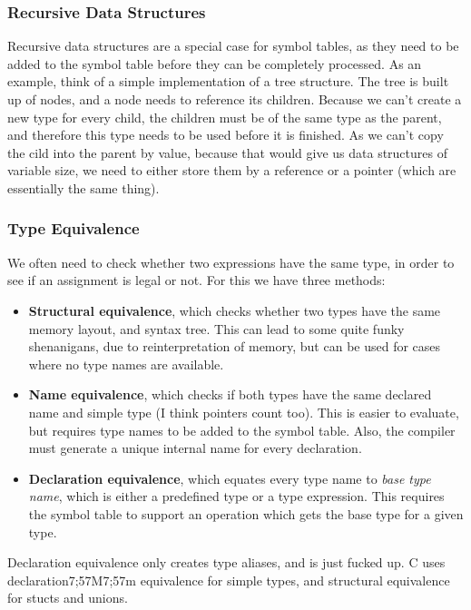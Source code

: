 \documentclass{article}
\begin{document}
\subsubsection{Recursive Data Structures}
Recursive data structures are a special case for symbol tables, as they need to be added to the symbol table before they can be completely processed.
As an example, think of a simple implementation of a tree structure.
The tree is built up of nodes, and a node needs to reference its children.
Because we can't create a new type for every child, the children must be of the same type as the parent, and therefore this type needs to be used before it is finished.
As we can't copy the cild into the parent by value, because that would give us data structures of variable size, we need to either store them by a reference or a pointer (which are essentially the same thing).

\subsubsection{Type Equivalence}
We often need to check whether two expressions have the same type, in order to see if an assignment is legal or not.
For this we have three methods:
\begin{itemize}
	\item \textbf{Structural equivalence}, which checks whether two types have the same memory layout, and syntax tree.
		This can lead to some quite funky shenanigans, due to reinterpretation of memory, but can be used for cases where no type names are available.
	\item \textbf{Name equivalence}, which checks if both types have the same declared name and simple type (I think pointers count too).
		This is easier to evaluate, but requires type names to be added to the symbol table.
		Also, the compiler must generate a unique internal name for every declaration.
	\item \textbf{Declaration equivalence}, which equates every type name to \emph{base type name}, which is either a predefined type or a type expression.
		This requires the symbol table to support an operation which gets the base type for a given type.
\end{itemize}

\begin{keypointbox}
	Declaration equivalence only creates type aliases, and is just fucked up.
	C uses declaration7;57M7;57m equivalence for simple types, and structural equivalence for stucts and unions.
\end{keypointbox}
\end{document}
